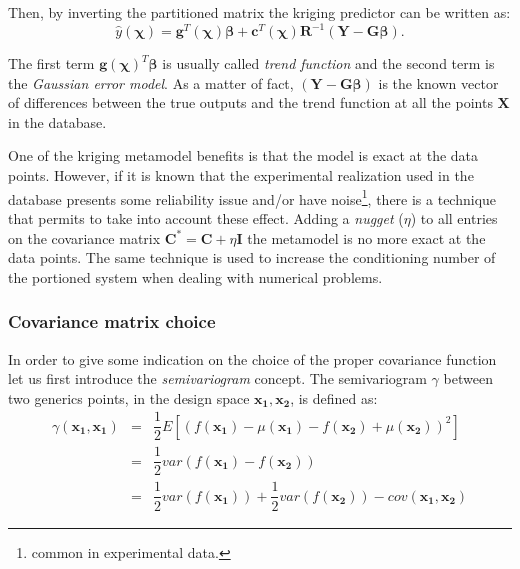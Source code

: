 \noindent Then, by inverting the partitioned matrix the kriging predictor can be written as:
\begin{equation}
\hat{y}(\boldsymbol{\chi}) = \mathbf{g}^T(\boldsymbol{\chi}) \boldsymbol{\beta} + \mathbf{c}^T(\boldsymbol{\chi}) \mathbf{R}^{-1} \left( \mathbf{Y} - \mathbf{G}\boldsymbol{\beta} \right).
\end{equation}

The first term $\mathbf{g}(\boldsymbol{\chi})^T \boldsymbol{\beta}$ is usually called \textit{trend function} and the second term is the \textit{Gaussian error model}. As a matter of fact, $\left( \mathbf{Y} - \mathbf{G}\boldsymbol{\beta} \right)$ is the known vector of differences between the true outputs and the trend function at all the points $\mathbf{X}$ in the database.

One of the kriging metamodel benefits is that the model is exact at the data points. However, if it is known that the experimental realization used in the database presents some reliability issue and/or have noise\footnote{common in experimental data.}, there is a technique that permits to take into account these effect.
Adding a \textit{nugget} ($\eta$) to all entries on the covariance matrix $\mathbf{C}^* = \mathbf{C} + \eta \mathbf{I}$ the metamodel is no more exact at the data points. The same technique is used to increase the conditioning number of the portioned system when dealing with numerical problems.

\subsubsection{Covariance matrix choice}
\label{sec:cov}

In order to give some indication on the choice of the proper covariance function let us first introduce the \textit{semivariogram} concept.
The semivariogram $\gamma$ between two generics points, in the design space  $\mathbf{x_1}, \mathbf{x_2}$, is defined as:
\begin{eqnarray}
\gamma(\mathbf{x_1}, \mathbf{x_1}) &=& \dfrac{1}{2} E \left[  (f(\mathbf{x_1}) -\mu(\mathbf{x_1}) -f(\mathbf{x_2}) +\mu(\mathbf{x_2}))^2 \right] \label{eq_semvar1}\\
&=& \dfrac{1}{2} var(f(\mathbf{x_1}) -f(\mathbf{x_2}) ) \nonumber \\
&=& \dfrac{1}{2} var(f(\mathbf{x_1}))  +\dfrac{1}{2} var(f(\mathbf{x_2})) -cov(\mathbf{x_1}, \mathbf{x_2}) \label{eq_semvar2}
\end{eqnarray}

